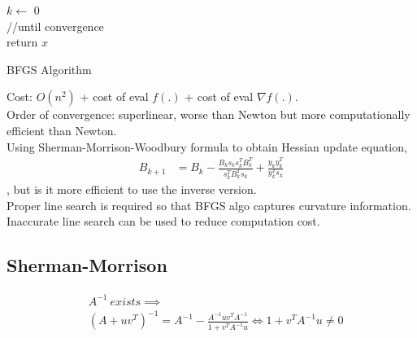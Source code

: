 \documentclass[8pt,letter]{article}
\begin{document}
\begin{multicols*}{2}
  \begin{algorithm}[H]
    $k \leftarrow$ 0\\
    //until convergence\\
    return $x$
    \caption{BFGS Algorithm\label{Algo_BFGS}}
  \end{algorithm}

  Cost: $O(n^2)$ + cost of eval $f(.)$ + cost of eval $\nabla f(.)$.\\
  Order of convergence: superlinear, worse than Newton but more computationally efficient than Newton.\\   
  
  Using Sherman-Morrison-Woodbury formula to obtain Hessian update equation,
  \begin{align*}
    B_{k+1} & = B_k - \frac{B_ks_k s_k^T B_k^T}{s_k^T B_k^T s_k} + \frac{y_k y_k^T}{y_k^T s_k}
  \end{align*}
  , but is it more efficient to use the inverse version.\\
  
  Proper line search is required so that BFGS algo captures curvature information.\\
  
  Inaccurate line search can be used to reduce computation cost.

  \subsection{Sherman-Morrison}
  \begin{align*}
    & A^{-1}\ exists \implies\\
    & (A+uv^T)^{-1} = A^{-1} - \frac{A^{-1}uv^TA^{-1}}{1+v^TA^{-1}u} \iff 1 + v^T A^{-1} u \neq 0
  \end{align*}
  

\end{multicols*}
\end{document}
